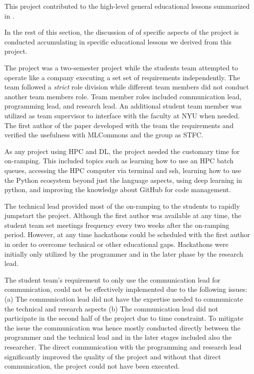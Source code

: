 \documentclass[sigplan,screen]{acmart}
\begin{document}
This project contributed to the  high-level general educational lessons summarized in \cite{las23-insights-mlcommons-education}. 

In the rest of this section, the discussion of of specific aspects of the project is conducted accumulating in specific educational lessons we derived from this project.

The project was a two-semester project while the students team attempted to operate like a company executing a set set of requirements independently. The team followed a {\em strict} role division while different team members did not conduct another team members role. Team member roles included communication lead, programming lead, and research lead. An additional student team member was utilized as team supervisor to interface with the faculty at NYU when needed. The first author of the paper developed with the team the  requirements and verified the usefulness with MLCommons and the group as STFC.

As any project using HPC and DL, the project needed the customary time for on-ramping. This included topics such as learning how to use an HPC batch queues, accessing the HPC computer via terminal and ssh, learning how to use the Python ecosystem beyond just the language aspects, using deep learning in python, and improving the knowledge about GitHub for code management.


The technical lead provided most of the on-ramping to the students to rapidly jumpstart the project. Although the first author was available at any time, the student team set meetings frequency every two weeks after the on-ramping period. However, at any time hackathons could be scheduled with the first author in order to overcome technical or other educational gaps. Hackathons were initially only utilized by the programmer and in the later phase by the research lead.

The student team's requirement to only use the communication lead for communication, could not be effectively implemented due to the following issues: (a) The communication lead did not have the expertise needed to communicate the technical and research aspects (b) The communication lead did not participate in the second half of the project due to time constraint. To mitigate the issue the communication was hence mostly conducted directly between the programmer and the technical lead and in the later stages included also the researcher. The direct communication with the programming and research lead significantly improved the quality of the project and without that direct communication, the project could not have been executed.
\end{document}
